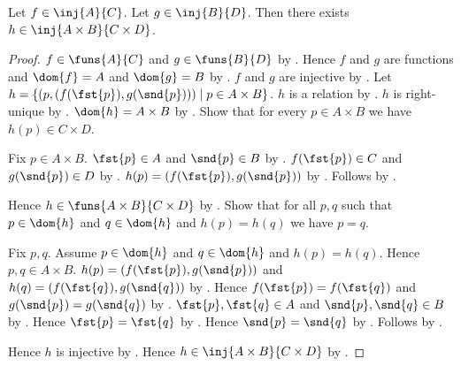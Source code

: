 \begin{theorem}\label{times_injection_congruent}
    Let $f\in\inj{A}{C}$.
    Let $g\in\inj{B}{D}$.
    Then there exists $h\in\inj{A\times B}{C\times D}$.
\end{theorem}
\begin{proof}
    $f\in\funs{A}{C}$ and $g\in\funs{B}{D}$ by .
    Hence $f$ and $g$ are functions and $\dom{f}=A$ and $\dom{g}=B$
        by .
    $f$ and $g$ are injective by .
    Let $h=\{(p,(f(\fst{p}),g(\snd{p})))\mid p\in A\times B\}$.
    $h$ is a relation by .
    $h$ is right-unique by .
    $\dom{h}=A\times B$ by .
    Show that for every $p\in A\times B$ we have
        $h(p)\in C\times D$.
    \begin{subproof}
        Fix $p\in A\times B$.
        $\fst{p}\in A$ and $\snd{p}\in B$ by .
        $f(\fst{p})\in C$ and $g(\snd{p})\in D$
            by .
        $h(p)=(f(\fst{p}),g(\snd{p}))$
            by .
        Follows by .
    \end{subproof}
    Hence $h\in\funs{A\times B}{C\times D}$ by .
    Show that for all $p,q$ such that $p\in\dom{h}$ and
        $q\in\dom{h}$ and $h(p)=h(q)$ we have $p=q$.
    \begin{subproof}
        Fix $p,q$.
        Assume $p\in\dom{h}$ and $q\in\dom{h}$ and $h(p)=h(q)$.
        Hence $p,q\in A\times B$.
        $h(p)=(f(\fst{p}),g(\snd{p}))$ and
            $h(q)=(f(\fst{q}),g(\snd{q}))$
            by .
        Hence $f(\fst{p})=f(\fst{q})$ and
            $g(\snd{p})=g(\snd{q})$ by .
        $\fst{p},\fst{q}\in A$ and $\snd{p},\snd{q}\in B$
            by .
        Hence $\fst{p}=\fst{q}$ by .
        Hence $\snd{p}=\snd{q}$ by .
        Follows by
            .
    \end{subproof}
    Hence $h$ is injective by .
    Hence $h\in\inj{A\times B}{C\times D}$
        by .
\end{proof}

